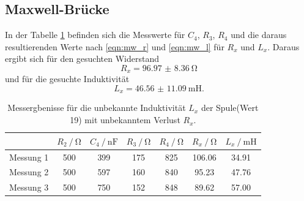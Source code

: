 \subsection{Maxwell-Brücke}
In der Tabelle \ref{tab:mwd_19} befinden sich die Messwerte für $C_4$, $R_3$, $R_4$ und die daraus resultierenden Werte nach \eqref{eqn:mw_r}
und \eqref{eqn:mw_l} für $R_x$ und $L_x$. Daraus ergibt sich für den gesuchten Widerstand
\begin{equation*}
  R_x = \SI{96.97(836)}{\ohm}
\end{equation*}
und für die gesuchte Induktivität
\begin{equation*}
  L_x = \SI{46.56(1109)}{\milli \henry} .
\end{equation*}
\begin{table}
  \centering
  \begin{tabular}{c|cccccc}
    \toprule
                & {$R_2\:/\: \si{\ohm}$} & {$C_4 \:/\: \si{\nano \farad}$} & {$R_3\:/\: \si{\ohm}$} & {$R_4\:/\: \si{\ohm}$} & {$R_x\:/\: \si{\ohm}$} & {$L_x \:/\: \si{\milli \henry}$} \\
    \midrule
    {Messung 1} & 500 & 399 & 175 & 825 & 106.06 & 34.91 \\
    {Messung 2} & 500 & 597 & 160 & 840 & 95.23 & 47.76 \\
    {Messung 3} & 500 & 750 & 152 & 848 & 89.62 & 57.00 \\
    \bottomrule
  \end{tabular}
  \caption{Messergbenisse für die unbekannte Induktivität $L_x$ der Spule(Wert 19) mit unbekanntem Verlust $R_x$.}
  \label{tab:mwd_19}
\end{table}
